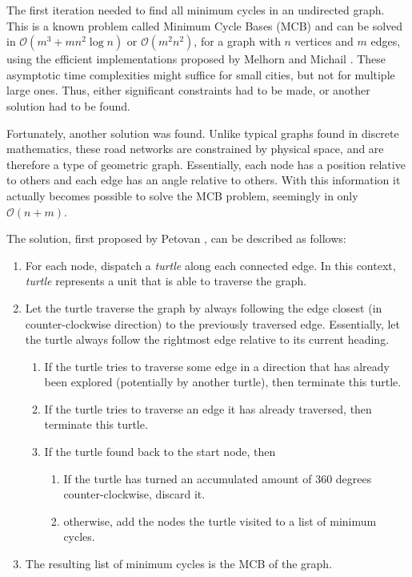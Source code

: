 The first iteration needed to find all minimum cycles in an undirected graph.
This is a known problem called Minimum Cycle Bases (MCB) and can be solved in $\mathcal{O}(m^3 + mn^2 \log n)$ or $\mathcal{O}(m^2n^2)$, for a graph with $n$ vertices and $m$ edges, using the efficient implementations proposed by Melhorn and Michail \cite{mcb_paper}.
These asymptotic time complexities might suffice for small cities, but not for multiple large ones.
Thus, either significant constraints had to be made, or another solution had to be found.

Fortunately, another solution was found.
Unlike typical graphs found in discrete mathematics, these road networks are constrained by physical space, and are therefore a type of geometric graph.
Essentially, each node has a position relative to others and each edge has an angle relative to others.
With this information it actually becomes possible to solve the MCB problem, seemingly in only $\mathcal{O}(n + m)$.

The solution, first proposed by Petovan \cite{petovan}, can be described as follows:
\vspace{-0.5cm} %
\begin{enumerate}
  \item For each node, dispatch a \textit{turtle} along each connected edge. In this context, \textit{turtle} represents a unit that is able to traverse the graph.
  \item Let the turtle traverse the graph by always following the edge closest (in counter-clockwise direction) to the previously traversed edge. Essentially, let the turtle always follow the rightmost edge relative to its current heading.
  \begin{enumerate}
    \item If the turtle tries to traverse some edge in a direction that has already been explored (potentially by another turtle), then terminate this turtle.
    \item If the turtle tries to traverse an edge it has already traversed, then terminate this turtle.
    \item If the turtle found back to the start node, then
      \begin{enumerate}
        \item If the turtle has turned an accumulated amount of 360 degrees counter-clockwise, discard it.
        \item otherwise, add the nodes the turtle visited to a list of minimum cycles.
      \end{enumerate}
  \end{enumerate}
  \item The resulting list of minimum cycles is the MCB of the graph.
\end{enumerate}


